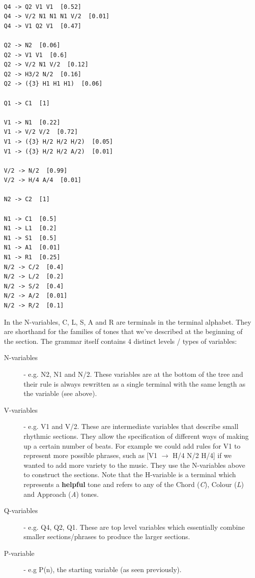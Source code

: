 \documentclass[pdftex,12pt,a4paper]{report}
\begin{document}
\begin{verbatim}

Q4 -> Q2 V1 V1  [0.52]
Q4 -> V/2 N1 N1 N1 V/2  [0.01]
Q4 -> V1 Q2 V1  [0.47]

Q2 -> N2  [0.06]
Q2 -> V1 V1  [0.6]
Q2 -> V/2 N1 V/2  [0.12]
Q2 -> H3/2 N/2  [0.16]
Q2 -> ({3} H1 H1 H1)  [0.06]

Q1 -> C1  [1]

V1 -> N1  [0.22]
V1 -> V/2 V/2  [0.72]
V1 -> ({3} H/2 H/2 H/2)  [0.05]
V1 -> ({3} H/2 H/2 A/2)  [0.01]

V/2 -> N/2  [0.99]
V/2 -> H/4 A/4  [0.01]

N2 -> C2  [1]

N1 -> C1  [0.5]
N1 -> L1  [0.2]
N1 -> S1  [0.5]
N1 -> A1  [0.01]
N1 -> R1  [0.25]
N/2 -> C/2  [0.4]
N/2 -> L/2  [0.2]
N/2 -> S/2  [0.4]
N/2 -> A/2  [0.01]
N/2 -> R/2  [0.1]

\end{verbatim}

In the N-variables, C, L, S, A and R are terminals in the terminal alphabet. They are shorthand for the families of tones that we've described at the beginning of the section. The grammar itself contains 4 distinct levels / types of variables:

\begin{description}
  \item[N-variables] - e.g. N2, N1 and N/2. These variables are at the bottom of the tree and their rule is always rewritten as a single terminal with the same length as the variable (see above).
  \item[V-variables]  - e.g. V1 and V/2. These are intermediate variables that describe small rhythmic sections. They allow the specification of different ways of making up a certain number of beats. For example we could add rules for V1 to represent more possible phrases, such as [V1 $\rightarrow$ H/4 N/2 H/4] if we wanted to add more variety to the music. They use the N-variables above to construct the sections. Note that the H-variable is a terminal which represents a \textbf{helpful} tone and refers to any of the Chord (\textit{C}), Colour (\textit{L}) and Approach (\textit{A}) tones.
  \item[Q-variables] - e.g. Q4, Q2, Q1. These are top level variables which essentially combine smaller sections/phrases to produce the larger sections. 
  \item[P-variable] - e.g P(n), the starting variable (as seen previously).
\end{description}
\end{document}
